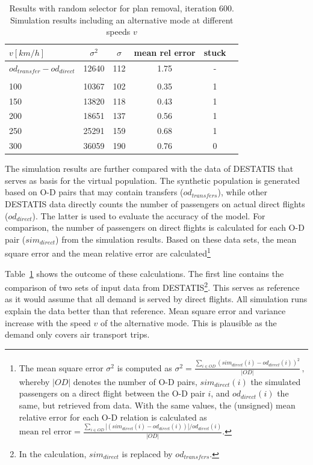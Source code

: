 \begin{table}[t]
\centering
		\begin{tabular}{@{}l|ccccc@{}}
			$v [km/h]$ & $\sigma^2$ & $\sigma$ & mean rel error  & stuck \\
\hline
 $od_{transfer} - od_{direct}$ &  12640 & 112 & 1.75 & - \\
 \\
 100	& 10367 & 102 & %
 0.35%
 &  %
 1
 \\	%
 150	& 13820 & 118 & 0.43 &  1 \\	%
 200 & 18651 & 137 & 0.56 &  1 \\	%
 250 & 25291 & 159 & 0.68 & 1 \\	%
 300 & 36059 & 190 & 0.76 & 0 \\	%
		\end{tabular}
		\caption{Results with random selector for plan removal, iteration 600. Simulation results including an alternative mode at different speeds $v$}
		\label{tab:2009_results_alternative_mode_psl}
\end{table}

The simulation results are further compared with the data of DESTATIS that serves as basis for the virtual population.  
The synthetic population is generated based on O-D pairs that may contain transfers ($od_{transfers}$), 
while other DESTATIS data directly counts the number of passengers on actual direct flights ($od_{direct}$). %
The latter is used to evaluate the accuracy of the model.
For comparison, the number of passengers on direct flights is calculated for each O-D pair ($sim_{direct}$) from the simulation results.
Based on these data sets, the mean square error and the mean relative error are calculated\footnote{
The mean square error $\sigma^2$ is computed as
	$\sigma^2 = \frac{\sum_{i \in OD} (sim_{direct}(i) - od_{direct}(i))^2}{|OD|} \, , $
whereby $|OD|$ denotes the number of O-D pairs, $sim_{direct}(i)$ the simulated passengers on a direct flight between the O-D pair $i$, and $od_{direct}(i)$ the same, but retrieved from data.  
With the same values, the (unsigned) mean relative error for each O-D relation is calculated as
$
\mbox{mean rel error} = \frac{\sum_{i \in OD} |(sim_{direct}(i) - od_{direct}(i))|/ od_{direct}(i)}{|OD|}.
$
}

Table~\ref{tab:2009_results_alternative_mode_psl} shows the outcome of these calculations. 
The first line contains the comparison of two sets of input data from DESTATIS\footnote{In the calculation, $sim_{direct}$ is replaced by $od_{transfers}$.}. 
This serves as reference as it would assume that all demand is served by direct flights.
All simulation runs explain the data better than that reference.
Mean square error and variance increase with the speed $v$ of the alternative mode.  
This is plausible as the demand only covers air transport trips. 


